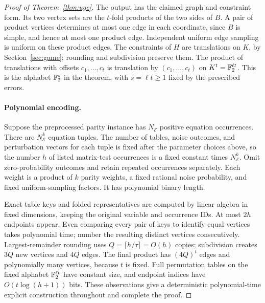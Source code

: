 \begin{proof}[Proof of Theorem~\ref{thm:ugc}]
The output has the claimed graph and constraint form.  Its two vertex
sets are the $t$-fold products of the two sides of $B$.  A pair of
product vertices determines at most one edge in each coordinate,
since $B$ is simple, and hence at most one product edge.  Independent
uniform edge sampling is uniform on these product edges.  The
constraints of $H$ are translations on $K$, by
Section~\ref{sec:game}; rounding and subdivision preserve them.
The product of translations with offsets $c_1,\ldots,c_t$ is
translation by $(c_1,\ldots,c_t)$ on $K^t=\mathbb F_2^{\ell t}$.  This is
the alphabet $\mathbb F_2^s$ in the theorem, with $s=\ell t\ge1$ fixed by
the prescribed errors.

\paragraph{Polynomial encoding.}
Suppose the preprocessed parity instance has $N_{\mathcal E}$ positive
equation occurrences.  There are $N_{\mathcal E}^k$ equation tuples.
The number of tables, noise outcomes, and perturbation vectors for each
tuple is fixed after the parameter choices above, so the number $h$ of
listed matrix-test occurrences is a fixed constant times
$N_{\mathcal E}^k$.  Omit
zero-probability outcomes and retain repeated occurrences separately.
Each weight is a product of $k$ parity weights, a fixed rational
noise probability, and fixed uniform-sampling factors.  It has
polynomial binary length.

Exact table keys and folded representatives are computed by linear
algebra in fixed dimensions, keeping the original variable and
occurrence IDs.  At most $2h$ endpoints appear.  Even comparing every
pair of keys to identify equal vertices takes polynomial time; number
the resulting distinct vertices consecutively.
Largest-remainder rounding uses $Q=\lceil h/\tau\rceil=O(h)$ copies;
subdivision creates $3Q$ new vertices and $4Q$ edges.  The final
product has $(4Q)^t$ edges and polynomially many vertices, because
$t$ is fixed.  Full permutation tables on the fixed alphabet
$\mathbb F_2^{\ell t}$ have constant size, and endpoint indices have
$O(t\log(h+1))$ bits.  These observations give a deterministic
polynomial-time explicit construction throughout and complete the
proof.
\end{proof}
